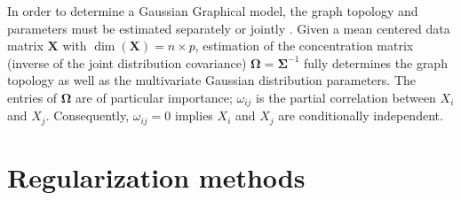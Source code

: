 \documentclass[11pt]{article}
\begin{document}
In order to determine a Gaussian Graphical model, the graph topology and parameters must be estimated separately \citep{meinshausen2006} or jointly \citep{friedman2007,yuan2007,banerjee2008}. Given a mean centered data matrix $\textbf{X}$ with $\dim(\textbf{X})=n\times p$, estimation of the concentration matrix (inverse of the joint distribution covariance) $\boldsymbol{\Omega}=\boldsymbol{\Sigma}^{-1}$ fully determines the graph topology as well as the multivariate Gaussian distribution parameters. The entries of $\boldsymbol{\Omega}$ are of particular importance; $\omega_{ij}$ is the partial correlation between $X_i$ and $X_j$. Consequently, $\omega_{ij}=0$ implies $X_i$ and $X_j$ are conditionally independent.

\section{Regularization methods}
\end{document}
